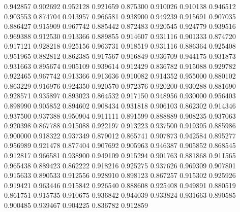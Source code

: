 0.942857
0.902692
0.952128
0.921659
0.875300
0.910026
0.910138
0.946512
0.903553
0.874704
0.913957
0.966581
0.938900
0.949239
0.915691
0.907035
0.886427
0.915909
0.967742
0.885442
0.872483
0.920545
0.924779
0.939516
0.969388
0.912530
0.913366
0.889855
0.914607
0.931116
0.901333
0.874720
0.917121
0.928218
0.925156
0.963731
0.918519
0.931116
0.886364
0.925408
0.951965
0.882812
0.862385
0.917567
0.916849
0.936709
0.944175
0.931873
0.931663
0.895674
0.905109
0.939614
0.912429
0.836782
0.915088
0.929782
0.922465
0.967742
0.913366
0.913636
0.910082
0.914352
0.955000
0.880102
0.863229
0.916976
0.924350
0.920570
0.972376
0.920200
0.930288
0.881690
0.928571
0.935897
0.893023
0.864532
0.917150
0.948956
0.930000
0.956403
0.898990
0.905852
0.894602
0.908434
0.931818
0.906103
0.862302
0.914346
0.937500
0.937388
0.950904
0.911111
0.891599
0.888889
0.908235
0.937063
0.920398
0.867788
0.915088
0.922197
0.913223
0.937500
0.919395
0.885986
0.900000
0.918322
0.937349
0.879012
0.865741
0.907873
0.942584
0.895277
0.956989
0.921478
0.877404
0.907692
0.905963
0.946387
0.905852
0.868545
0.912817
0.966581
0.938900
0.949109
0.915294
0.901763
0.881868
0.911565
0.965438
0.889423
0.862222
0.918216
0.925275
0.937626
0.969309
0.907801
0.915633
0.890533
0.912556
0.928910
0.898123
0.867257
0.915302
0.925926
0.919421
0.963446
0.915842
0.926540
0.888608
0.925408
0.949891
0.880519
0.861751
0.915735
0.910675
0.936842
0.944039
0.933824
0.931663
0.890585
0.900485
0.939467
0.904225
0.836782
0.912859
